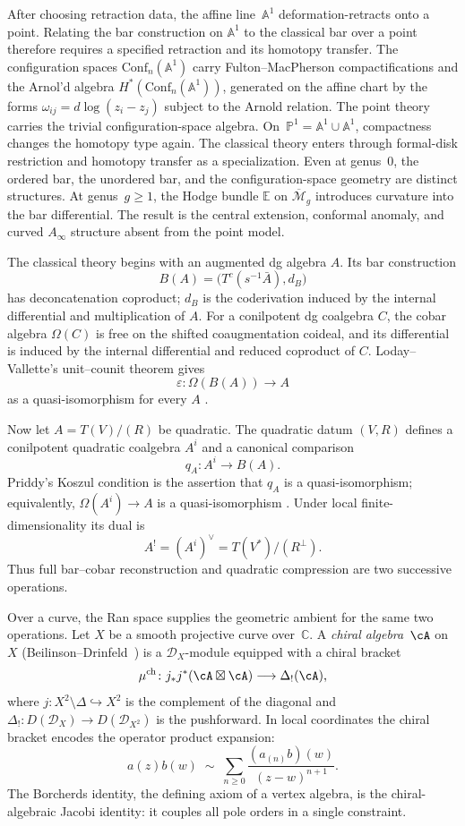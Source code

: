 After choosing retraction data, the affine line~$\mathbb{A}^1$
deformation-retracts onto a point. Relating the bar construction on
$\mathbb{A}^1$ to the classical bar over a point therefore requires a
specified retraction and its homotopy transfer. The configuration
spaces $\mathrm{Conf}_n(\mathbb{A}^1)$ carry Fulton--MacPherson
compactifications and the Arnol'd algebra
$H^*(\mathrm{Conf}_n(\mathbb{A}^1))$, generated on the affine chart by
the forms $\omega_{ij} = d\log(z_i - z_j)$ subject to the Arnold
relation.
The point theory carries the trivial configuration-space algebra.
On~$\mathbb{P}^1 = \mathbb{A}^1 \cup \mathbb{A}^1$, compactness
changes the homotopy type again. The classical theory enters through
formal-disk restriction and homotopy transfer as a specialization.
Even at genus~$0$, the ordered bar, the unordered bar, and the
configuration-space geometry are distinct structures. At
genus~$g \geq 1$, the Hodge bundle $\mathbb{E}$ on
$\overline{\mathcal{M}}_g$ introduces curvature into the bar
differential. The result is the central extension, conformal anomaly,
and curved $A_\infty$ structure absent from the point model.

The classical theory begins with an augmented dg algebra $A$.  Its
bar construction
\[
B(A)=\bigl(T^c(s^{-1}\bar A),d_B\bigr)
\]
has deconcatenation coproduct; $d_B$ is the coderivation induced by
the internal differential and multiplication of $A$.  For a
conilpotent dg coalgebra $C$, the cobar algebra
$\Omega(C)$ is free on the shifted coaugmentation coideal, and its
differential is induced by the internal differential and reduced
coproduct of $C$.  Loday--Vallette's unit--counit theorem gives
\[
\varepsilon \colon \Omega(B(A)) \longrightarrow A
\]
as a quasi-isomorphism for every $A$
\cite[Corollary~2.3.4]{LV12}.

Now let $A=T(V)/(R)$ be quadratic.  The quadratic datum $(V,R)$
defines a conilpotent quadratic coalgebra $A^i$ and a canonical
comparison
\[
q_A\colon A^i\longrightarrow B(A).
\]
Priddy's Koszul condition is the assertion that $q_A$ is a
quasi-isomorphism; equivalently,
$\Omega(A^i)\to A$ is a quasi-isomorphism
\cite{Priddy70,LV12}.  Under local finite-dimensionality its dual is
\[
A^!=(A^i)^\vee=T(V^*)/(R^\perp).
\]
Thus full bar--cobar reconstruction and quadratic compression are two
successive operations.

Over a curve, the Ran space supplies the geometric ambient for the
same two operations.  Let $X$ be a smooth projective curve
over~$\mathbb{C}$. A \emph{chiral algebra}~$\cA$ on~$X$
(Beilinson--Drinfeld~\cite{BD04}) is a $\mathcal{D}_X$-module equipped
with a chiral bracket
\[
\mu^{\mathrm{ch}} \colon j_* j^*(\cA \boxtimes \cA) \longrightarrow \Delta_!(\cA),
\]
where $j \colon X^2 \setminus \Delta \hookrightarrow X^2$ is the complement of the diagonal and $\Delta_! \colon D(\mathcal{D}_X) \to D(\mathcal{D}_{X^2})$ is the pushforward. In local coordinates the chiral bracket encodes the operator product expansion:
\[
a(z) b(w) \;\sim\; \sum_{n \geq 0} \frac{(a_{(n)} b)(w)}{(z - w)^{n+1}}.
\]
The Borcherds identity, the defining axiom of a vertex algebra, is the chiral-algebraic Jacobi identity: it couples all pole orders in a single constraint.

